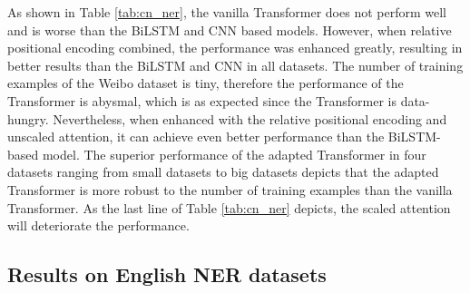 \documentclass[11pt,a4paper]{article}
\begin{document}
As shown in Table \ref{tab:cn_ner}, the vanilla Transformer does not perform well and is worse than the BiLSTM and CNN based models. However, when relative positional encoding combined, the performance was enhanced greatly, resulting in better results than the BiLSTM and CNN in all datasets. The number of training examples of the Weibo dataset is tiny, therefore the performance of the Transformer is abysmal, which is as expected since the Transformer is data-hungry. Nevertheless, when enhanced with the relative positional encoding and unscaled attention, it can achieve even better performance than the BiLSTM-based model. The superior performance of the adapted Transformer in four datasets ranging from small datasets to big datasets depicts that the adapted Transformer is more robust to the number of training examples than the vanilla Transformer. As the last line of Table \ref{tab:cn_ner} depicts, the scaled attention will deteriorate the performance.

\subsection{Results on English NER datasets}
\end{document}
